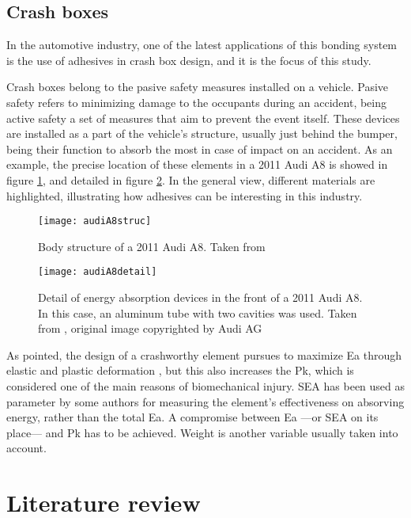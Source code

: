\subsection{Crash boxes}
In the automotive industry, one of the latest applications of this bonding system is the use of adhesives in crash box design, and it is the focus of this study.

Crash boxes belong to the pasive safety measures installed on a vehicle. Pasive safety refers to minimizing damage to the occupants during an accident, being active safety a set of measures that aim to prevent the event itself.
These devices are installed as a part of the vehicle's structure, usually just behind the bumper, being their function to absorb the most in case of impact on an accident. As an example, the precise location of these elements in a 2011 Audi A8 is showed in figure \ref{fig:audi_struc}, and detailed in figure \ref{fig:audi_detail}. In the general view, different materials are highlighted, illustrating how adhesives can be interesting in this industry.

\begin{figure}
\centering
\texttt{[image: audiA8struc]}
\caption{Body structure of a 2011 Audi A8. Taken from \citet{phdCostas}}
\label{fig:audi_struc}
\end{figure}

\begin{figure}
\centering
\texttt{[image: audiA8detail]}
\caption{Detail of energy absorption devices in the front of a 2011 Audi A8. In this case, an aluminum tube with two cavities was used. Taken from \citet{phdCostas}, original image copyrighted by Audi AG \citep{audi}}
\label{fig:audi_detail}
\end{figure}

As \citet{Hou2008} pointed, the design of a crashworthy element pursues to maximize \gls{Ea} through elastic and plastic deformation \citep{Wu2006}, but this also increases the \gls{Pk}, which is considered one of the main reasons of biomechanical injury. \Gls{SEA} has been used as parameter by some authors \citep{Lee2006, Peroni2009, Scattina2011} for measuring the element's effectiveness on absorving energy, rather than the total \gls{Ea}. A compromise between \gls{Ea} ---or \gls{SEA} on its place--- and \gls{Pk} has to be achieved. Weight is another variable usually taken into account.

\section{Literature review}

